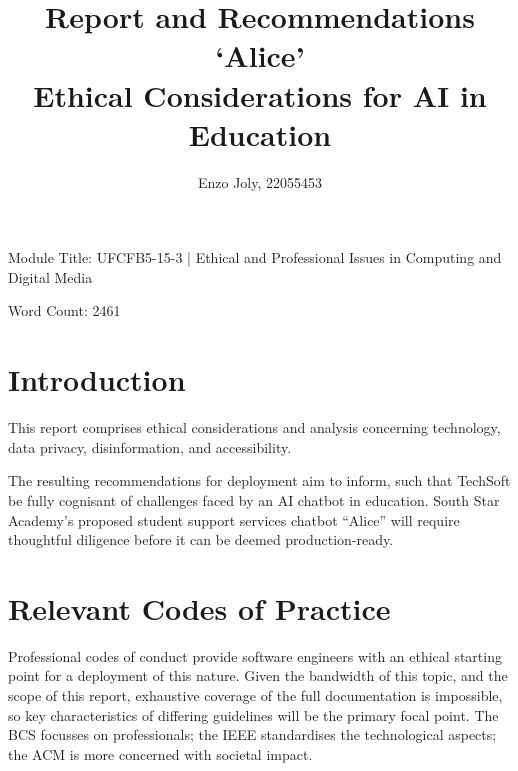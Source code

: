 \documentclass[14pt,a4paper]{article}
\title{Report and Recommendations\\ `Alice' \\ Ethical Considerations for AI in Education}
\author{Enzo Joly, 22055453}
\date{}
\begin{document}
\maketitle

Module Title: UFCFB5-15-3 | Ethical and Professional Issues in Computing and Digital Media

Word Count: 2461


\thispagestyle{empty}

\newpage

\tableofcontents
{}

\newpage


\begin{multicols}{2}
\section{Introduction}
This report comprises ethical considerations and analysis concerning technology, data privacy, disinformation, and accessibility.

The resulting recommendations for deployment aim to inform, such that TechSoft be fully cognisant of challenges faced by an AI chatbot in education.
South Star Academy's proposed student support services chatbot ``Alice'' will require thoughtful diligence before it can be deemed production-ready.





\section{Relevant Codes of Practice}
Professional codes of conduct provide software engineers with an ethical starting point for a deployment of this nature.
Given the bandwidth of this topic, and the scope of this report, exhaustive coverage of the full documentation is impossible, so key characteristics of differing guidelines will be the primary focal point.
The BCS focusses on professionals; the IEEE standardises the technological aspects; the ACM is more concerned with societal impact.


\end{multicols}
\end{document}
